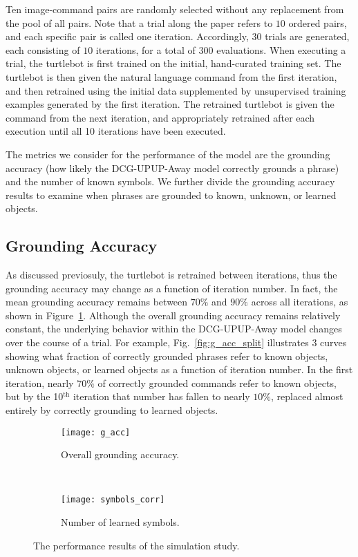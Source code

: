 Ten image-command pairs are randomly selected without any replacement from the pool of all pairs.
Note that a trial along the paper refers to $10$ ordered pairs, and each specific pair is called one iteration.
Accordingly, $30$ trials are generated, each consisting of $10$ iterations, for a total of $300$ evaluations.
When executing a trial, the turtlebot is first trained on the initial, hand-curated training set.
The turtlebot is then given the natural language command from the first iteration, and then retrained using the initial data supplemented by unsupervised training examples generated by the first iteration.
The retrained turtlebot is given the command from the next iteration, and appropriately retrained after each execution until all 10 iterations have been executed.

The metrics we consider for the performance of the model are the grounding accuracy (how likely the DCG-UPUP-Away model correctly grounds a phrase) and the number of known symbols.
We further divide the grounding accuracy results to examine when phrases are grounded to known, unknown, or learned objects.
\subsection{Grounding Accuracy}
As discussed previosuly, the turtlebot is retrained between iterations, thus the grounding accuracy may change as a function of iteration number. In fact, the mean grounding accuracy remains between $70\%$ and $90\%$ across all iterations, as shown in Figure~\ref{fig:g_acc}. Although the overall grounding accuracy remains relatively constant, the underlying behavior within the DCG-UPUP-Away model changes over the course of a trial. For example, Fig.~\ref{fig:g_acc_split} illustrates 3 curves showing what fraction of correctly grounded phrases refer to known objects, unknown objects, or learned objects as a function of iteration number. In the first iteration, nearly $70\%$ of correctly grounded commands refer to known objects, but by the 10$^\text{th}$ iteration that number has fallen to nearly $10\%$, replaced almost entirely by correctly grounding to learned objects.

\begin{figure}[h!]
\begin{subfigure}[b]{0.47\columnwidth}
\centering
\texttt{[image: g\_acc]}
\caption{Overall grounding accuracy.}
\label{fig:g_acc}
\end{subfigure}
~
\begin{subfigure}[b]{0.50\columnwidth}
\centering
\texttt{[image: symbols\_corr]}
\caption{Number of learned symbols.}
\label{fig:symbols}
\end{subfigure}
\caption{The performance results of the simulation study.}
\end{figure}

